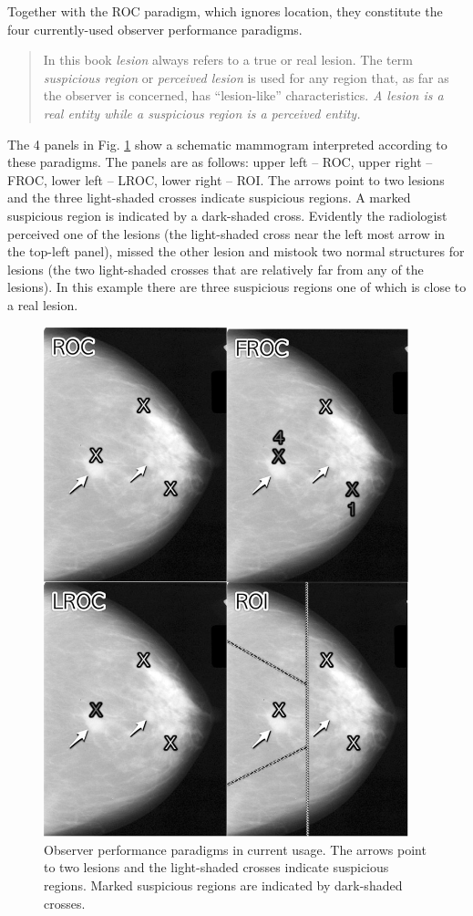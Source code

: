 \documentclass[
]{book}
\begin{document}
Together with the ROC paradigm, which ignores location, they constitute the four currently-used observer performance paradigms.

\begin{quote}
In this book \emph{lesion} always refers to a true or real lesion. The term \emph{suspicious region} or \emph{perceived lesion} is used for any region that, as far as the observer is concerned, has ``lesion-like'' characteristics. \emph{A lesion is a real entity while a suspicious region is a perceived entity.}
\end{quote}

The 4 panels in Fig. \ref{fig:froc-paradigm-4} show a schematic mammogram interpreted according to these paradigms. The panels are as follows: upper left -- ROC, upper right -- FROC, lower left -- LROC, lower right -- ROI. The arrows point to two lesions and the three light-shaded crosses indicate suspicious regions. A marked suspicious region is indicated by a dark-shaded cross. Evidently the radiologist perceived one of the lesions (the light-shaded cross near the left most arrow in the top-left panel), missed the other lesion and mistook two normal structures for lesions (the two light-shaded crosses that are relatively far from any of the lesions). In this example there are three suspicious regions one of which is close to a real lesion.

\begin{figure}

{\centering \includegraphics[width=300pt]{images/4Paradigms} 

}

\caption{Observer performance paradigms in current usage. The arrows point to two lesions and the light-shaded crosses indicate suspicious regions. Marked suspicious regions are indicated by dark-shaded crosses.}\label{fig:froc-paradigm-4}
\end{figure}
\end{document}
